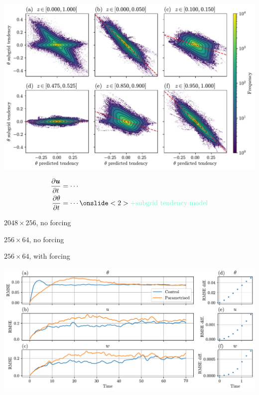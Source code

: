 \documentclass[12pt, aspectratio=169]{beamer}
\newcommand{\pdiff}[2]{\frac{\partial #1}{\partial #2}}
\renewcommand\vec{\bm}
\begin{document}
\begin{frame}
    \centering
    \includegraphics[height=0.99\textheight]{figures/theta_subgrid_vs_pred_tend.pdf}
\end{frame}

\begin{frame}
    \begin{align*}
        \pdiff{\vec{u}}{t} &= \cdots \\
        \pdiff{\theta}{t} &= \cdots \onslide<2>{\color{hilight} + \text{subgrid tendency model}}
    \end{align*}
\end{frame}

\begin{frame}
    \centering
    \begin{description}[align=right, labelwidth=0.5cm]
        \item[Truth] $2048 \times 256$, no forcing
        \item[Control]  $256 \times 64$, no forcing
        \item[Parametrised]  $256 \times 64$, with forcing
    \end{description}
\end{frame}

\begin{frame}
    \centering
    \includegraphics[width=\linewidth]{figures/rmse.pdf}
\end{frame}
\end{document}
